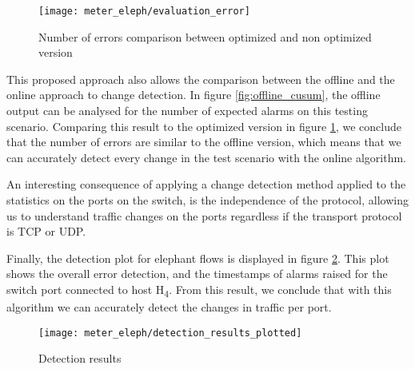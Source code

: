 \begin{figure} [H]
    \centering
    \texttt{[image: meter\_eleph/evaluation\_error]}
    \caption {Number of errors comparison between optimized and non optimized version}
    \label{fig:errors_comparaison}
\end{figure} 

\par This proposed approach also allows the comparison between the offline and the online approach to change detection. In figure \ref{fig:offline_cusum}, the 
offline output can be analysed for the number of expected alarms on this testing scenario. Comparing this result to the optimized version in figure 
\ref{fig:errors_comparaison}, we conclude that the number of errors are similar to the offline version, which means that we can accurately detect every change in
the test scenario with the online algorithm.

\par An interesting consequence of applying a change detection method applied to the statistics on the ports on the switch, is the independence of the protocol,
allowing us to understand traffic changes on the ports regardless if the transport protocol is TCP or UDP.

\par Finally, the detection plot for elephant flows is displayed in figure \ref{fig:color_plot}. This plot shows the overall error detection, and the timestamps
of alarms raised for the switch port connected to host H\textsubscript{4}. From this result, we conclude that with this algorithm we can accurately detect the 
changes in traffic per port.

\begin{figure}
    \centering
    \texttt{[image: meter\_eleph/detection\_results\_plotted]}
    \caption{Detection results}
    \label{fig:color_plot}
\end{figure}
